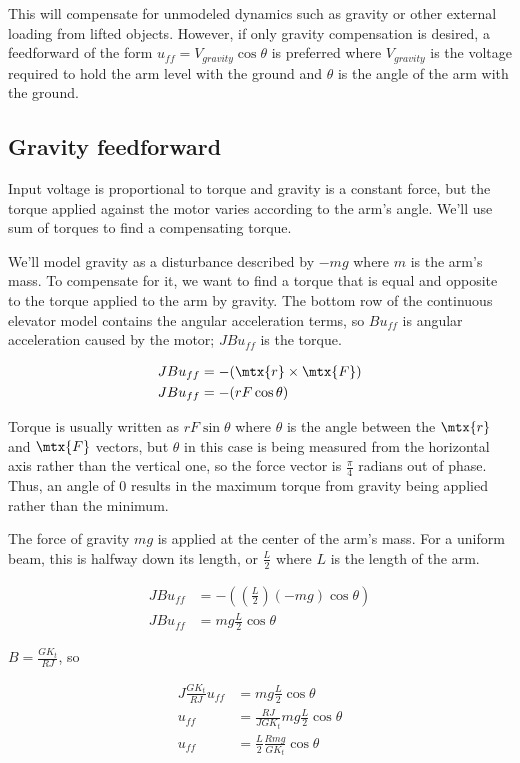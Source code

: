 This will compensate for unmodeled dynamics such as gravity or other external
loading from lifted objects. However, if only gravity compensation is desired,
a feedforward of the form $u_{ff} = V_{gravity} \cos\theta$ is preferred where
$V_{gravity}$ is the voltage required to hold the arm level with the ground and
$\theta$ is the angle of the arm with the ground.

\subsection{Gravity feedforward}

Input voltage is proportional to torque and gravity is a constant force, but the
torque applied against the motor varies according to the arm's angle. We'll use
sum of torques to find a compensating torque.

We'll model gravity as a disturbance described by $-mg$ where $m$ is the arm's
mass. To compensate for it, we want to find a torque that is equal and opposite
to the torque applied to the arm by gravity. The bottom row of the continuous
elevator model contains the angular acceleration terms, so $Bu_{ff}$ is angular
acceleration caused by the motor; $JBu_{ff}$ is the torque.

\begin{align*}
  J Bu_{ff} &= -(\mtx{r}\times\mtx{F}) \\
  J Bu_{ff} &= -(rF\cos\theta)
\end{align*}

Torque is usually written as $rF\sin\theta$ where $\theta$ is the angle between
the $\mtx{r}$ and $\mtx{F}$ vectors, but $\theta$ in this case is being measured
from the horizontal axis rather than the vertical one, so the force vector is
$\frac{\pi}{4}$ radians out of phase. Thus, an angle of $0$ results in the
maximum torque from gravity being applied rather than the minimum.

The force of gravity $mg$ is applied at the center of the arm's mass. For a
uniform beam, this is halfway down its length, or $\frac{L}{2}$ where $L$ is the
length of the arm.

\begin{align*}
  J Bu_{ff} &= -\left(\left(\frac{L}{2}\right)(-mg)\cos\theta\right) \\
  J Bu_{ff} &= mg \frac{L}{2}\cos\theta
\end{align*}

$B = \frac{GK_t}{RJ}$, so

\begin{align*}
  J \frac{GK_t}{RJ} u_{ff} &= mg \frac{L}{2}\cos\theta \\
  u_{ff} &= \frac{RJ}{JGK_t} mg \frac{L}{2}\cos\theta \\
  u_{ff} &= \frac{L}{2} \frac{Rmg}{GK_t}\cos\theta
\end{align*}


